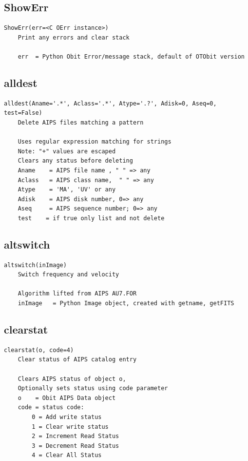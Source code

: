 \documentclass[11pt]{report}
\begin{document}
\subsection{ShowErr}
\begin{verbatim}
ShowErr(err=<C OErr instance>)
    Print any errors and clear stack
    
    err  = Python Obit Error/message stack, default of OTObit version
\end{verbatim}

\subsection{alldest}
\begin{verbatim}
alldest(Aname='.*', Aclass='.*', Atype='.?', Adisk=0, Aseq=0, test=False)
    Delete AIPS files matching a pattern
    
    Uses regular expression matching for strings
    Note: "+" values are escaped
    Clears any status before deleting
    Aname    = AIPS file name , " " => any
    Aclass   = AIPS class name,  " " => any
    Atype    = 'MA', 'UV' or any
    Adisk    = AIPS disk number, 0=> any
    Aseq     = AIPS sequence number; 0=> any
    test    = if true only list and not delete
\end{verbatim}

\subsection{altswitch}
\begin{verbatim}
altswitch(inImage)
    Switch frequency and velocity
    
    Algorithm lifted from AIPS AU7.FOR
    inImage   = Python Image object, created with getname, getFITS
\end{verbatim}

\subsection{clearstat}
\begin{verbatim}
clearstat(o, code=4)
    Clear status of AIPS catalog entry
    
    Clears AIPS status of object o,
    Optionally sets status using code parameter
    o    = Obit AIPS Data object
    code = status code:
        0 = Add write status
        1 = Clear write status
        2 = Increment Read Status
        3 = Decrement Read Status
        4 = Clear All Status
\end{verbatim}
\end{document}
